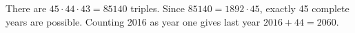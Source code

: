 There are $45\cdot44\cdot43=85140$ triples. Since $85140=1892\cdot45$, exactly 45 complete years are possible. Counting 2016 as year one gives last year $2016+44=\boxed{2060}$.
